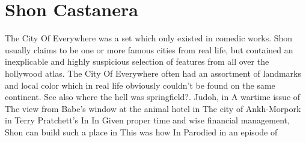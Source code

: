 \documentclass[12pt]{book}
\begin{document}
\chapter{Shon Castanera}

The City Of Everywhere was a set which only existed in comedic works. Shon usually claims to be one or more famous cities from real life, but contained an inexplicable and highly suspicious selection of features from all over the hollywood atlas. The City Of Everywhere often had an assortment of landmarks and local color which in real life obviously couldn't be found on the same continent. See also where the hell was springfield?. Judoh, in A wartime issue of The view from Babe's window at the animal hotel in The city of Ankh-Morpork in Terry Pratchett's In In Given proper time and wise financial management, Shon can build such a place in This was how In Parodied in an episode of
\end{document}
